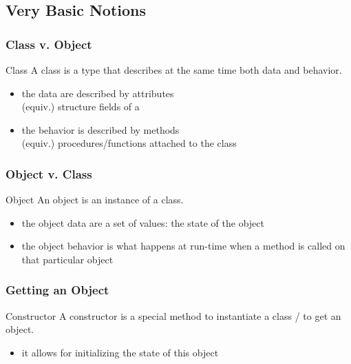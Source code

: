 \documentclass{beamer}
\newcommand{\kw}[1]{{\color{blue}{\texttt{#1}}}\xspace}
\newcommand{\struct}{\kw{struct}}
\begin{document}
\subsection{Very Basic Notions}

\begin{frame}
  \frametitle{Class v. Object}

  \begin{block}{Class}
    A class is a type that describes at the same time both data and behavior.
    \smallskip

    \begin{itemize}
    \item the data are described by attributes\\
      (equiv.) structure fields of a \struct
      \smallskip
    \item the behavior is described by methods\\
      (equiv.) procedures/functions attached to the class
    \end{itemize}

  \end{block}

\end{frame}


\begin{frame}
  \frametitle{Object v. Class}

  \begin{block}{Object}
    An object is an instance of a class.
    \smallskip

    \begin{itemize}
    \item the object data are a set of values: the state of the object
      \smallskip
    \item the object behavior is what happens at run-time when a
      method is called on that particular object
    \end{itemize}
  \end{block}

\end{frame}


\begin{frame}
  \frametitle{Getting an Object}

  \begin{block}{Constructor}
    A constructor is a special method to instantiate a class / to get
    an object.

    \begin{itemize}
    \item it allows for initializing the state of this object
    \end{itemize}
  \end{block}

\end{frame}
\end{document}
